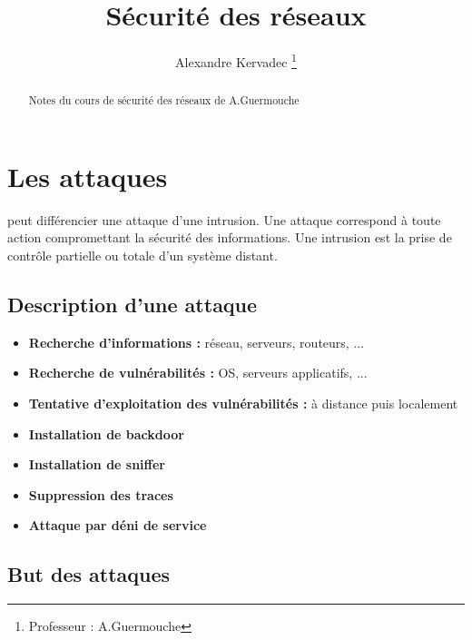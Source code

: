 \documentclass[journal, a4paper]{IEEEtran}
\begin{document}
	\title{Sécurité des réseaux}
	\author{Alexandre Kervadec
	\thanks{Professeur : A.Guermouche}}
	\maketitle

\begin{abstract}
	Notes du cours de sécurité des réseaux de A.Guermouche
\end{abstract}

\section{Les attaques}
	 peut différencier une attaque d'une intrusion. Une attaque correspond à toute action compromettant la sécurité des informations. Une intrusion est la prise de contrôle partielle ou totale d'un système distant.
	
	\subsection{Description d'une attaque}
	
		\begin{itemize}
			\item \textbf{Recherche d'informations :} réseau, serveurs, routeurs, ...
			\item \textbf{Recherche de vulnérabilités :} OS, serveurs applicatifs, ...
			\item \textbf{Tentative d'exploitation des vulnérabilités :} à distance puis localement
			\item \textbf{Installation de backdoor}
			\item \textbf{Installation de sniffer}
			\item \textbf{Suppression des traces}
			\item \textbf{Attaque par déni de service} 
		\end{itemize}
		
	\subsection{But des attaques}
	
\end{document}

